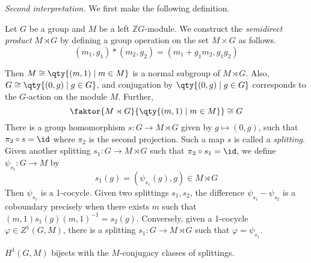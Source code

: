 \emph{Second interpretation.}
We first make the following definition.
\begin{definition}
    Let \( G \) be a group and \( M \) be a left \( \mathbb Z G \)-module.
    We construct the \emph{semidirect product} \( M \rtimes G \) by defining a group operation on the set \( M \times G \) as follows.
    \[ (m_1, g_1) \ast (m_2, g_2) = (m_1 + g_1 m_2, g_1 g_2) \]
\end{definition}
Then \( M \cong \qty{(m, 1) \mid m \in M} \) is a normal subgroup of \( M \rtimes G \).
Also, \( G \cong \qty{(0, g) \mid g \in G} \), and conjugation by \( \qty{(0, g) \mid g \in G} \) corresponds to the \( G \)-action on the module \( M \).
Further,
\[ \faktor{M \rtimes G}{\qty{(m, 1) \mid m \in M}} \cong G \]
There is a group homomorphism \( s : G \to M \rtimes G \) given by \( g \mapsto (0, g) \), such that \( \pi_2 \circ s = \id \) where \( \pi_2 \) is the second projection.
Such a map \( s \) is called a \emph{splitting}.
Given another splitting \( s_1 : G \to M \rtimes G \) such that \( \pi_2 \circ s_1 = \id \), we define \( \psi_{s_1} : G \to M \) by
\[ s_1(g) = (\psi_{s_1}(g), g) \in M \rtimes G \]
Then \( \psi_{s_1} \) is a 1-cocycle.
Given two splittings \( s_1, s_2 \), the difference \( \psi_{s_1} - \psi_{s_2} \) is a coboundary precisely when there exists \( m \) such that \( (m, 1)s_1(g)(m,1)^{-1} = s_2(g) \).
Conversely, given a 1-cocycle \( \varphi \in Z^1(G, M) \), there is a splitting \( s_1 : G \to M \rtimes G \) such that \( \varphi = \psi_{s_1} \).
\begin{theorem}
    \( H^1(G, M) \) bijects with the \( M \)-conjugacy classes of splittings.
\end{theorem}

